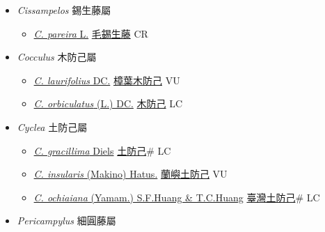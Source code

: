 
  \begin{itemize}
 \item[] \textit{Cissampelos} 錫生藤屬 
                    
  \begin{itemize}
        \item[] \href{http://www.theplantlist.org/tpl1.1/search?q=Cissampelos+pareira}{\textit{C. pareira} L.}   \href{\detokenize{http://taibnet.sinica.edu.tw/chi/taibnet_species_list.php?T2=毛錫生藤&T2_new_value=true&fr=y}}{毛錫生藤} CR
  \end{itemize}
 \item[] \textit{Cocculus} 木防己屬
                    
  \begin{itemize}
        \item[] \href{http://www.theplantlist.org/tpl1.1/search?q=Cocculus+laurifolius}{\textit{C. laurifolius} DC.}   \href{\detokenize{http://taibnet.sinica.edu.tw/chi/taibnet_species_list.php?T2=樟葉木防己&T2_new_value=true&fr=y}}{樟葉木防己} VU
        \item[] \href{http://www.theplantlist.org/tpl1.1/search?q=Cocculus+orbiculatus}{\textit{C. orbiculatus} (L.) DC.}   \href{\detokenize{http://taibnet.sinica.edu.tw/chi/taibnet_species_list.php?T2=木防己&T2_new_value=true&fr=y}}{木防己} LC
  \end{itemize}
 \item[] \textit{Cyclea} 土防己屬
                    
  \begin{itemize}
        \item[] \href{http://www.theplantlist.org/tpl1.1/search?q=Cyclea+gracillima}{\textit{C. gracillima} Diels}   \href{\detokenize{http://taibnet.sinica.edu.tw/chi/taibnet_species_list.php?T2=土防己&T2_new_value=true&fr=y}}{土防己}\# LC
        \item[] \href{http://www.theplantlist.org/tpl1.1/search?q=Cyclea+insularis}{\textit{C. insularis} (Makino) Hatus.}   \href{\detokenize{http://taibnet.sinica.edu.tw/chi/taibnet_species_list.php?T2=蘭嶼土防己&T2_new_value=true&fr=y}}{蘭嶼土防己} VU
        \item[] \href{http://www.theplantlist.org/tpl1.1/search?q=Cyclea+ochiaiana}{\textit{C. ochiaiana} (Yamam.) S.F.Huang \& T.C.Huang}   \href{\detokenize{http://taibnet.sinica.edu.tw/chi/taibnet_species_list.php?T2=臺灣土防己&T2_new_value=true&fr=y}}{臺灣土防己}\# LC
  \end{itemize}
 \item[] \textit{Pericampylus} 細圓藤屬
                    

\end{itemize}
